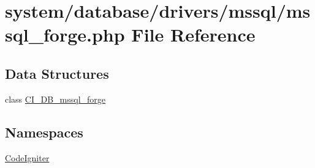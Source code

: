 \hypertarget{mssql__forge_8php}{\section{system/database/drivers/mssql/mssql\-\_\-forge.php File Reference}
\label{mssql__forge_8php}
}
\subsection*{Data Structures}
\begin{DoxyCompactItemize}
\item 
class \hyperlink{class_c_i___d_b__mssql__forge}{C\-I\-\_\-\-D\-B\-\_\-mssql\-\_\-forge}
\end{DoxyCompactItemize}
\subsection*{Namespaces}
\begin{DoxyCompactItemize}
\item 
\hyperlink{namespace_code_igniter}{Code\-Igniter}
\end{DoxyCompactItemize}
